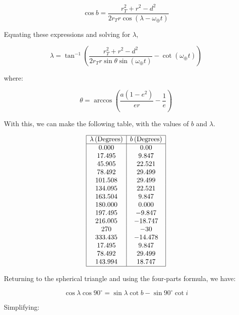 \documentclass[11pt]{article}
\begin{document}
\begin{pproblem}
\begin{pssolution*}{}{}
\begin{alternativas}
            \[\cos b  = \frac{r_T^2 + r^2 - d^2}{2 r_T r\cos (\lambda - \omega_\oplus t)}\]

            Equating these expressions and solving for \(\lambda\),

            \[\lambda = \tan^{-1} \left( 
                \frac{r_T^2 + r^2 - d^2}{2 r_T r \sin \theta \sin (\omega_\oplus t)} - \cot (\omega_\oplus t)
                \right)\]

            where:

            \[
            \theta = \arccos \left( \frac{a (1 - e^2)}{e r} - \frac{1}{e} \right)
            \] 
            
            With this, we can make the following table, with the values of \(b\) and \(\lambda\).

            \[
            \begin{array}{|c|c|}
            \hline
            \lambda \, (\text{Degrees}) & b \, (\text{Degrees}) \\ \hline
            0.000     & 0.00     \\ 
            17.495    & 9.847    \\ 
            45.905    & 22.521   \\ 
            78.492    & 29.499   \\ 
            101.508   & 29.499   \\ 
            134.095   & 22.521   \\ 
            163.504   & 9.847    \\ 
            180.000   & 0.000    \\ 
            197.495   & -9.847   \\ 
            216.005   & -18.747  \\ 
            270       & -30      \\ 
            333.435   & -14.478  \\ 
            17.495    & 9.847    \\ 
            78.492    & 29.499   \\ 
            143.994   & 18.747   \\ \hline
            \end{array}
            \]

            Returning to the spherical triangle and using the four-parts formula, we have:

            \[\cos\lambda\cos90^\circ = \sin\lambda\cot b -\sin90^\circ\cot i\]

            Simplifying:


\end{alternativas}
\end{pssolution*}
\end{pproblem}
\end{document}
